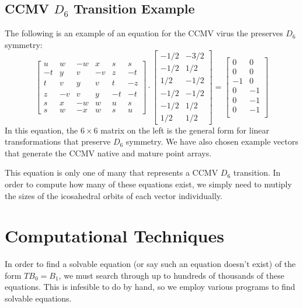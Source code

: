 \documentclass[a4paper,10pt]{article}
\theoremstyle{plain}
\theoremstyle{definition}
\theoremstyle{remark}
\begin{document}
\subsection{CCMV \(D_6\) Transition Example}
The following is an example of an equation for the CCMV virus the preserves \(D_6\) symmetry:
\begin{equation}
	\begin{bmatrix}
	    u  & w  & -w & x  & s  & s  \\
	    -t & y  & v  & -v & z  & -t \\
	    t  & v  & y  & v  & t  & -z \\
	    z  & -v & v  & y  & -t & -t \\
	    s  & x  & -w & w  & u  & s  \\
	    s  & w  & -x & w  & s  & u 
	\end{bmatrix}
	\cdot
	\begin{bmatrix}
	-1/2 & -3/2 \\
	-1/2 & 1/2 \\
	1/2 & -1/2 \\
	-1/2 & -1/2 \\
	-1/2 & 1/2 \\
	1/2 & 1/2
	\end{bmatrix} 
	=
	\begin{bmatrix}
	0 & 0 \\
	0 & 0 \\
	-1 & 0 \\
	0 & -1 \\
	0 & -1 \\
	0 & -1 \\
	\end{bmatrix}
	\label{eq:ccmv_d6_example}
\end{equation}
In this equation, the \( 6 \times 6 \) matrix on the left is the general form for linear transformations that preserve \( D_6 \) symmetry.
We have also chosen example vectors that generate the CCMV native and mature point arrays.

This equation is only one of many that represents a CCMV \( D_6 \) transition.
In order to compute how many of these equations exist, we simply need to mutiply the sizes of the icosahedral orbits of each vector individually.


\section{Computational Techniques}
In order to find a solvable equation (or say such an equation doesn't exist) of the form \(TB_0 = B_1\), we must search through up to hundreds of thousands of these equations.
This is infesible to do by hand, so we employ various programs to find solvable equations.
\end{document}
